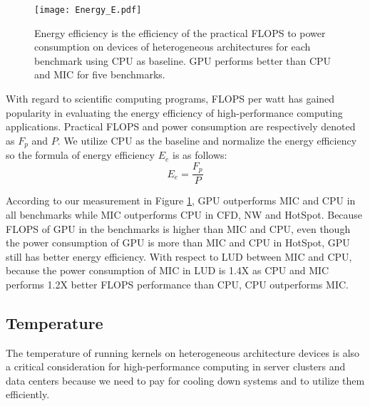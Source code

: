     \begin{figure}[h!]
  \centering
  \begin{minipage}{0.5\textwidth}
    \centering
   \centering
     \texttt{[image: Energy\_E.pdf]}    
\caption{Energy efficiency is the efficiency of the practical FLOPS to power consumption on devices of heterogeneous architectures for each benchmark using CPU as baseline. GPU performs better than CPU and MIC for five benchmarks.} 
\label{fig:energyE}
\end{minipage}%
\end{figure}


With regard to scientific computing programs, FLOPS per watt has gained popularity in evaluating the energy efficiency of high-performance computing applications. Practical FLOPS and power consumption are respectively denoted as $F_{p}$ and $P$. We utilize CPU as the baseline and normalize the energy efficiency so the formula of energy efficiency $E_{e}$ is as follows:
\begin{equation}\label{equ:energyE}
	{E_{e}} = \frac{F_{p}}{P}
\end{equation}
  
According to our measurement in Figure \ref{fig:energyE}, GPU outperforms MIC and CPU in all benchmarks while MIC outperforms CPU in CFD, NW and HotSpot. Because FLOPS of GPU in the benchmarks is higher than MIC and CPU, even though the power consumption of GPU is more than MIC and CPU in HotSpot, GPU still has better energy efficiency. With respect to LUD between MIC and CPU, because the power consumption of MIC in LUD is 1.4X as CPU and MIC performs 1.2X better FLOPS performance than CPU, CPU outperforms MIC.


\subsection{Temperature}

The temperature of running kernels on heterogeneous architecture devices is also a critical consideration for high-performance computing in server clusters and data centers because we need to pay for cooling down systems and to utilize them efficiently. 

